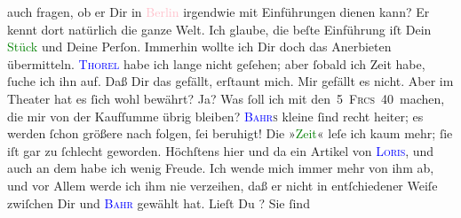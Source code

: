                auch fragen, ob er Dir in \textcolor{pink}{Berlin}{}\ledrightnote{\textcolor{pink}{Berlin}} irgendwie mit
               Einführungen dienen kann? Er kennt dort natürlich {\pb}die ganze Welt. Ich glaube, die beſte Einführung iſt Dein \textcolor{green}{Stück}{} und Deine Perſon. Immerhin wollte ich
               Dir doch das Anerbieten übermitteln.\pend
           \pstart
           \textsc{\textcolor{blue}{Thorel}{}\ledrightnote{\textcolor{blue}{Jean Thorel}}} habe ich lange nicht geſehen; aber ſobald ich Zeit habe, ſuche ich ihn auf.\pend
           \pstart
           Daß Dir das \label{K_L02765-2v}\label{K_L02765-2h} gefällt, erſtaunt mich. Mir gefällt es nicht. Aber im Theater hat es ſich
               wohl bewährt? Ja? Was ſoll ich mit den 5 \textsc{Frcs} 40 machen,
               die mir von der Kaufſumme übrig bleiben?\pend
           \pstart
           \textsc{\textcolor{blue}{Bahr}{}\ledrightnote{\textcolor{blue}{Hermann Bahr}}s} kleine \label{K_L02765-5v}\label{K_L02765-5h} ſind recht heiter; {\pb}es werden ſchon größere nach folgen, ſei beruhigt!
               Die »\textcolor{green}{Zeit}{}\ledrightnote{\textcolor{green}{Die Zeit. Wiener Wochenschrift}}« leſe ich kaum mehr; ſie iſt gar zu
               ſchlecht geworden. Höchſtens hier und da ein Artikel von \textsc{\textcolor{blue}{Loris}{}\ledrightnote{\textcolor{blue}{Hugo von Hofmannsthal}}}, und auch an dem habe ich wenig Freude. Ich wende mich immer mehr von ihm ab,
               und vor Allem werde ich ihm nie verzeihen, daß er nicht in entſchiedener Weiſe
               zwiſchen Dir und \textsc{\textcolor{blue}{Bahr}{}\ledrightnote{\textcolor{blue}{Hermann Bahr}}} gewählt hat. Lieſt Du \label{K_L02765-3v}\label{K_L02765-3h}? Sie ſind
